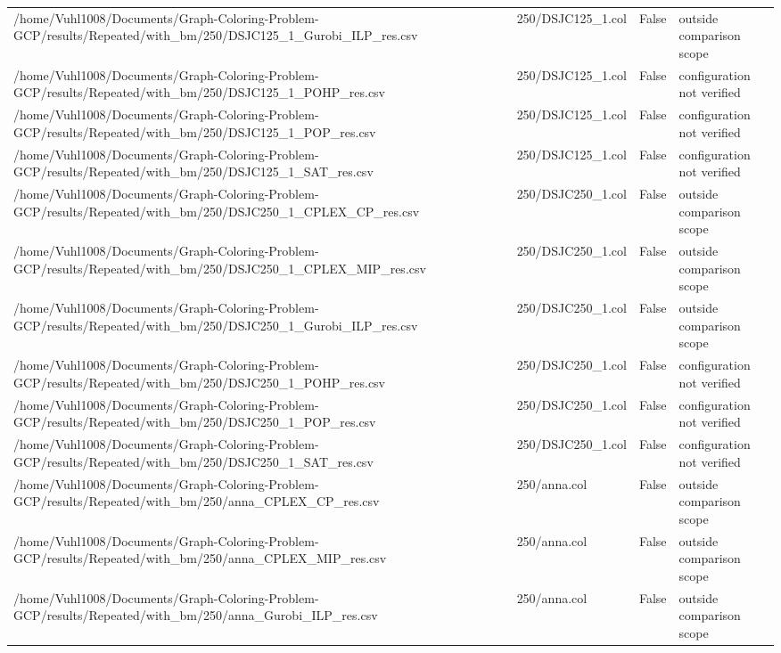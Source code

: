 \begin{table}[htbp]
\begin{tabular}{llll}
/home/Vuhl1008/Documents/Graph-Coloring-Problem-GCP/results/Repeated/with\_bm/250/DSJC125\_1\_Gurobi\_ILP\_res.csv & 250/DSJC125\_1.col & False & outside comparison scope \\
/home/Vuhl1008/Documents/Graph-Coloring-Problem-GCP/results/Repeated/with\_bm/250/DSJC125\_1\_POHP\_res.csv & 250/DSJC125\_1.col & False & configuration not verified \\
/home/Vuhl1008/Documents/Graph-Coloring-Problem-GCP/results/Repeated/with\_bm/250/DSJC125\_1\_POP\_res.csv & 250/DSJC125\_1.col & False & configuration not verified \\
/home/Vuhl1008/Documents/Graph-Coloring-Problem-GCP/results/Repeated/with\_bm/250/DSJC125\_1\_SAT\_res.csv & 250/DSJC125\_1.col & False & configuration not verified \\
/home/Vuhl1008/Documents/Graph-Coloring-Problem-GCP/results/Repeated/with\_bm/250/DSJC250\_1\_CPLEX\_CP\_res.csv & 250/DSJC250\_1.col & False & outside comparison scope \\
/home/Vuhl1008/Documents/Graph-Coloring-Problem-GCP/results/Repeated/with\_bm/250/DSJC250\_1\_CPLEX\_MIP\_res.csv & 250/DSJC250\_1.col & False & outside comparison scope \\
/home/Vuhl1008/Documents/Graph-Coloring-Problem-GCP/results/Repeated/with\_bm/250/DSJC250\_1\_Gurobi\_ILP\_res.csv & 250/DSJC250\_1.col & False & outside comparison scope \\
/home/Vuhl1008/Documents/Graph-Coloring-Problem-GCP/results/Repeated/with\_bm/250/DSJC250\_1\_POHP\_res.csv & 250/DSJC250\_1.col & False & configuration not verified \\
/home/Vuhl1008/Documents/Graph-Coloring-Problem-GCP/results/Repeated/with\_bm/250/DSJC250\_1\_POP\_res.csv & 250/DSJC250\_1.col & False & configuration not verified \\
/home/Vuhl1008/Documents/Graph-Coloring-Problem-GCP/results/Repeated/with\_bm/250/DSJC250\_1\_SAT\_res.csv & 250/DSJC250\_1.col & False & configuration not verified \\
/home/Vuhl1008/Documents/Graph-Coloring-Problem-GCP/results/Repeated/with\_bm/250/anna\_CPLEX\_CP\_res.csv & 250/anna.col & False & outside comparison scope \\
/home/Vuhl1008/Documents/Graph-Coloring-Problem-GCP/results/Repeated/with\_bm/250/anna\_CPLEX\_MIP\_res.csv & 250/anna.col & False & outside comparison scope \\
/home/Vuhl1008/Documents/Graph-Coloring-Problem-GCP/results/Repeated/with\_bm/250/anna\_Gurobi\_ILP\_res.csv & 250/anna.col & False & outside comparison scope \\

\end{tabular}
\end{table}
